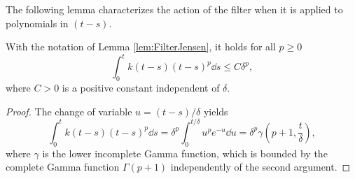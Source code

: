 \documentclass[10pt]{article}
\begin{document}
\begin{appendices}
The following lemma characterizes the action of the filter when it is applied to polynomials in $(t-s)$.
\begin{lemma}\label{lem:FilterPoly} With the notation of Lemma \ref{lem:FilterJensen}, it holds for all $p \geq 0$
	\begin{equation}
		\int_0^t k(t-s)(t-s)^p \dd s \leq C \delta^p,
	\end{equation}
	where $C > 0$ is a positive constant independent of $\delta$.
\end{lemma}
\begin{proof} The change of variable $u = (t-s)/\delta$ yields
	\begin{equation}
		\int_0^t k(t-s)(t-s)^p \dd s = \delta^p \int_0^{t/\delta} u^p e^{-u} \dd u = \delta^p \gamma\left(p+1, \frac{t}{\delta}\right),
	\end{equation}
	where $\gamma$ is the lower incomplete Gamma function, which is bounded by the complete Gamma function $\Gamma(p+1)$ independently of the second argument.
\end{proof}



\end{appendices}
\end{document}
